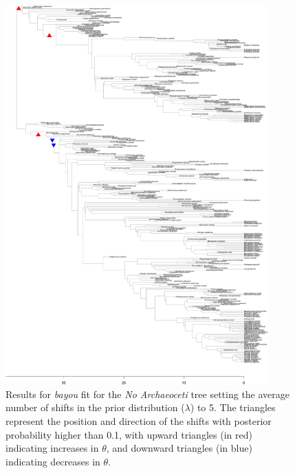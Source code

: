 \begin{figure}[H]
\includegraphics[width=0.9\textwidth]{img/plots-noarchaeo-wZBL-k5-1.pdf}
\caption{Results for \textit{bayou} fit for the \textit{No Archaeoceti} tree setting the average number of shifts in the prior distribution ($\lambda$) to 5. The triangles represent the position and direction of the shifts with posterior probability higher than 0.1, with upward triangles (in red) indicating increases in $\theta$, and downward triangles (in blue) indicating decreases in $\theta$.}
\label{fig:noarchaeo-k5}
\end{figure}

\newpage

